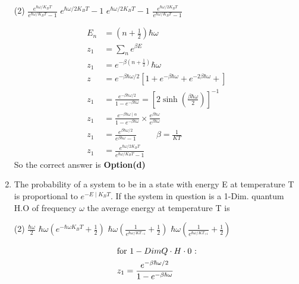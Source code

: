 \begin{enumerate}
\begin{tasks}(2)
	\task[\textbf{a.}]$\frac{e^{\hbar\omega/K_BT}}{e^{\hbar\omega/K_BT}-1}$
	\task[\textbf{b.}]$e^{\hbar \omega / 2 K_{B} T}-1$
	\task[\textbf{c.}]$e^{\hbar  \omega / 2 K_{B} T}-1$
	\task[\textbf{d.}] $\frac{e^{\hbar \omega / 2 K_{B} T}}{e^{\hbar \omega / K_{B} T}-1}$
\end{tasks}
\begin{answer}
	\begin{align*}
	E_{n}&=\left(n+\frac{1}{2}\right) { \hbar\omega } \\
	z_{1}&=\sum_{n} e^{\beta E}\\
	z_1&=e^{-\beta\left(n+\frac{1}{2} \right) }\hbar \omega\\
	z&=e^{-\beta \hbar \omega / 2}\left[1+e^{-\beta \hbar \omega}+e^{-2 \beta \hbar \omega}+\right]\\
	z_{1}&=\frac{e^{-\beta \hbar \omega / 2}}{1-e^{-\beta \hbar \omega}}=\left[2 \sinh \left(\frac{\beta \hbar \omega}{2}\right)\right]^{-1}\\
	z_{1}&=\frac{e^{-\beta \hbar \omega \mid \alpha}}{1-e^{-\beta \hbar \omega}} \times \frac{e^{\beta \hbar \omega}}{e^{\beta \hbar \omega}}\\
	z_{1}&=\frac{e^{\beta \hbar \omega / 2}}{e^{\beta \hbar \omega}-1}\hspace{1cm} \beta=\frac{1}{K T}\\
	z_{1}&=\frac{e^{\hbar \omega / 2 K_{B} T}}{e^{\hbar \omega / K_{B} T}-1}
	\end{align*}
	So the correct answer is \textbf{Option(d)}
\end{answer}
\item 	The probability of a system to be in a state with energy E at temperature T is proportional to $e^{-E \mid K_{B} T}$. If the system in question is a 1-Dim. quantum H.O of frequency $\omega$ the average energy at temperature T is
	\begin{tasks}(2)
		\task[\textbf{a.}]$\frac{\hbar\omega}{2}$
		\task[\textbf{b.}]$\hbar \omega\left(e^{-\hbar \omega K_{B} T}+\frac{1}{2}\right)$
		\task[\textbf{c.}]$\hbar \omega\left(\frac{1}{e^{\hbar\omega/KT_{-1}}}+\frac{1}{2}\right)$
		\task[\textbf{d.}] $\hbar \omega\left(\frac{1}{e^{\hbar\omega/KT_{+1}}}+\frac{1}{2}\right)$
	\end{tasks}
\begin{answer}
	\begin{align*}
	\intertext{for $1-Dim Q \cdot H \cdot 0$ :}
	z_{1}&=\frac{e^{-\beta \hbar \omega / 2}}{1-e^{-\beta \hbar \omega}}\\

\end{align*}
\end{answer}
\end{enumerate}
